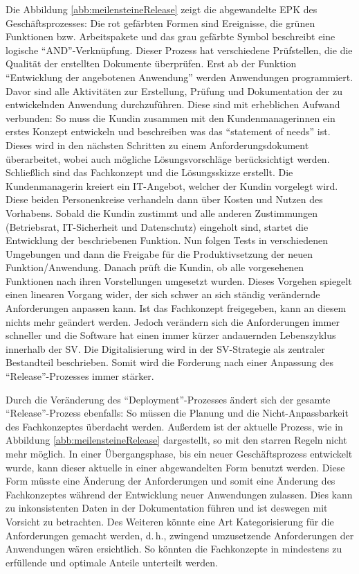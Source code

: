 Die Abbildung \vref{abb:meilensteineRelease} zeigt die abgewandelte \ac{EPK} des Geschäftsprozesses: Die rot gefärbten Formen sind Ereignisse, die grünen Funktionen bzw. Arbeitspakete und das grau gefärbte Symbol beschreibt eine logische \enquote{AND}-Verknüpfung. Dieser Prozess hat verschiedene Prüfstellen, die die Qualität der erstellten Dokumente überprüfen. Erst ab der Funktion \enquote{Entwicklung der angebotenen Anwendung} werden Anwendungen programmiert. Davor sind alle Aktivitäten zur Erstellung, Prüfung und Dokumentation der zu entwickelnden Anwendung durchzuführen. Diese sind mit erheblichen Aufwand verbunden: So muss die Kundin zusammen mit den Kundenmanagerinnen ein erstes Konzept entwickeln und beschreiben was das \enquote{statement of needs} ist. Dieses wird in den nächsten Schritten zu einem Anforderungsdokument überarbeitet, wobei auch mögliche Lösungsvorschläge berücksichtigt werden. Schließlich sind das Fachkonzept und die Lösungsskizze erstellt. Die Kundenmanagerin kreiert ein IT-Angebot, welcher der Kundin vorgelegt wird. Diese beiden Personenkreise verhandeln dann über Kosten und Nutzen des Vorhabens. Sobald die Kundin zustimmt und alle anderen Zustimmungen (Betriebsrat, IT-Sicherheit und Datenschutz) eingeholt sind, startet die Entwicklung der beschriebenen Funktion. Nun folgen Tests in verschiedenen Umgebungen und dann die Freigabe für die Produktivsetzung der neuen Funktion/Anwendung. Danach prüft die Kundin, ob alle vorgesehenen Funktionen nach ihren Vorstellungen umgesetzt wurden. Dieses Vorgehen spiegelt einen linearen Vorgang wider, der sich schwer an sich ständig verändernde Anforderungen anpassen kann. Ist das Fachkonzept freigegeben, kann an diesem nichts mehr geändert werden. Jedoch verändern sich die Anforderungen immer schneller und die Software hat einen immer kürzer andauernden Lebenszyklus innerhalb der \ac{SV}. Die Digitalisierung wird in der \ac{SV}-Strategie als zentraler Bestandteil beschrieben.\autocite[vgl.][]{sv_sparkassenversicherung_sv_2019} Somit wird die Forderung nach einer Anpassung des \enquote{Release}-Prozesses immer stärker.
\par
Durch die Veränderung des \enquote{Deployment}-Prozesses ändert sich der gesamte \enquote{Release}-Prozess ebenfalls: So müssen die Planung und die Nicht-Anpassbarkeit des Fachkonzeptes überdacht werden. Außerdem ist der aktuelle Prozess, wie in Abbildung \vref{abb:meilensteineRelease} dargestellt, so mit den starren Regeln nicht mehr möglich. In einer Übergangsphase, bis ein neuer Geschäftsprozess entwickelt wurde, kann dieser aktuelle in einer abgewandelten Form benutzt werden. Diese Form müsste eine Änderung der Anforderungen und somit eine Änderung des Fachkonzeptes während der Entwicklung neuer Anwendungen zulassen. Dies kann zu inkonsistenten Daten in der Dokumentation führen und ist deswegen mit Vorsicht zu betrachten. Des Weiteren könnte eine Art Kategorisierung für die Anforderungen gemacht werden, d.\,h., zwingend umzusetzende Anforderungen der Anwendungen wären ersichtlich. So könnten die Fachkonzepte in mindestens zu erfüllende und optimale Anteile unterteilt werden. 
